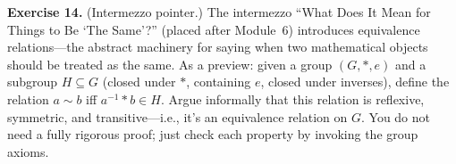 \documentclass[11pt]{article}
\begin{document}
\bigskip
\textbf{Exercise 14.}\label{ex:m5:14} (Intermezzo pointer.) The intermezzo ``What Does It Mean for Things to Be `The Same'?'' (placed after Module~6) introduces equivalence relations---the abstract machinery for saying when two mathematical objects should be treated as the same. As a preview: given a group $(G, *, e)$ and a subgroup $H \subseteq G$ (closed under $*$, containing $e$, closed under inverses), define the relation $a \sim b$ iff $a^{-1} * b \in H$. Argue informally that this relation is reflexive, symmetric, and transitive---i.e., it's an equivalence relation on $G$. You do not need a fully rigorous proof; just check each property by invoking the group axioms.
\end{document}

